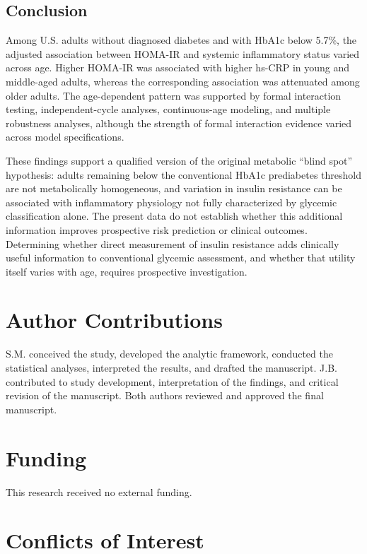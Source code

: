 \documentclass[11pt]{article}
\begin{document}
\subsection{Conclusion}

Among U.S. adults without diagnosed diabetes and with HbA1c below 5.7\%,
the adjusted association between HOMA-IR and systemic inflammatory status
varied across age. Higher HOMA-IR was associated with higher hs-CRP in
young and middle-aged adults, whereas the corresponding association was
attenuated among older adults. The age-dependent pattern was supported by
formal interaction testing, independent-cycle analyses, continuous-age
modeling, and multiple robustness analyses, although the strength of formal
interaction evidence varied across model specifications.

These findings support a qualified version of the original metabolic
``blind spot'' hypothesis: adults remaining below the conventional HbA1c
prediabetes threshold are not metabolically homogeneous, and variation in
insulin resistance can be associated with inflammatory physiology not fully
characterized by glycemic classification alone. The present data do not
establish whether this additional information improves prospective risk
prediction or clinical outcomes. Determining whether direct measurement of
insulin resistance adds clinically useful information to conventional
glycemic assessment, and whether that utility itself varies with age,
requires prospective investigation.


\section*{Author Contributions}

S.M. conceived the study, developed the analytic framework, conducted
the statistical analyses, interpreted the results, and drafted the
manuscript. J.B. contributed to study development, interpretation of
the findings, and critical revision of the manuscript. Both authors
reviewed and approved the final manuscript.

\section*{Funding}

This research received no external funding.

\section*{Conflicts of Interest}
\end{document}
